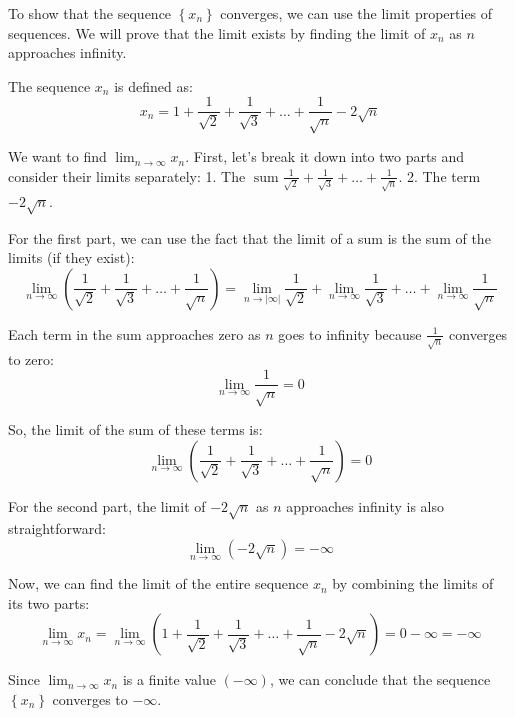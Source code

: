 \documentclass{report}
\begin{document}

To show that the sequence $\left\{x_n\right\}$ converges, we can use the limit properties of sequences. We will prove that the limit exists by finding the limit of $x_n$ as $n$ approaches infinity.

The sequence $x_n$ is defined as:
$$
x_n=1+\frac{1}{\sqrt{2}}+\frac{1}{\sqrt{3}}+\ldots+\frac{1}{\sqrt{n}}-2 \sqrt{n}
$$

We want to find $\lim _{n \rightarrow \infty} x_n$. First, let's break it down into two parts and consider their limits separately:
1. The $\operatorname{sum} \frac{1}{\sqrt{2}}+\frac{1}{\sqrt{3}}+\ldots+\frac{1}{\sqrt{n}}$.
2. The term $-2 \sqrt{n}$.

For the first part, we can use the fact that the limit of a sum is the sum of the limits (if they exist):
$$
\lim _{n \rightarrow \infty}\left(\frac{1}{\sqrt{2}}+\frac{1}{\sqrt{3}}+\ldots+\frac{1}{\sqrt{n}}\right)=\lim _{n \rightarrow|\infty|} \frac{1}{\sqrt{2}}+\lim _{n \rightarrow \infty} \frac{1}{\sqrt{3}}+\ldots+\lim _{n \rightarrow \infty} \frac{1}{\sqrt{n}}
$$

Each term in the sum approaches zero as $n$ goes to infinity because $\frac{1}{\sqrt{n}}$ converges to zero:
$$
\lim _{n \rightarrow \infty} \frac{1}{\sqrt{n}}=0
$$

So, the limit of the sum of these terms is:
$$
\lim _{n \rightarrow \infty}\left(\frac{1}{\sqrt{2}}+\frac{1}{\sqrt{3}}+\ldots+\frac{1}{\sqrt{n}}\right)=0
$$

For the second part, the limit of $-2 \sqrt{n}$ as $n$ approaches infinity is also straightforward:
$$
\lim _{n \rightarrow \infty}(-2 \sqrt{n})=-\infty
$$

Now, we can find the limit of the entire sequence $x_n$ by combining the limits of its two parts:
$$
\lim _{n \rightarrow \infty} x_n=\lim _{n \rightarrow \infty}\left(1+\frac{1}{\sqrt{2}}+\frac{1}{\sqrt{3}}+\ldots+\frac{1}{\sqrt{n}}-2 \sqrt{n}\right)=0-\infty=-\infty
$$

Since $\lim _{n \rightarrow \infty} x_n$ is a finite value $(-\infty)$, we can conclude that the sequence $\left\{x_n\right\}$ converges to $-\infty$.
\end{document}
